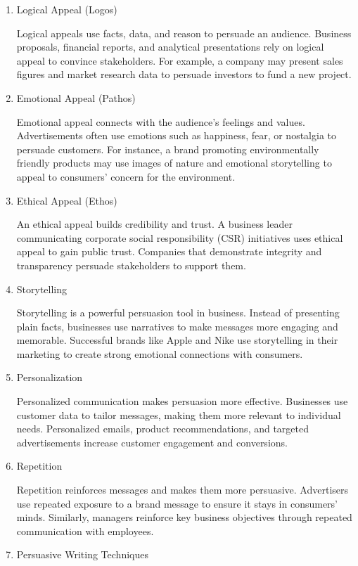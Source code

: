 \documentclass[a4paper]{article}
\begin{document}
\begin{enumerate}
\item Logical Appeal (Logos)

Logical appeals use facts, data, and reason to persuade an audience. Business proposals, financial reports, and analytical presentations rely on logical appeal to convince stakeholders. For example, a company may present sales figures and market research data to persuade investors to fund a new project.

\item Emotional Appeal (Pathos)

Emotional appeal connects with the audience’s feelings and values. Advertisements often use emotions such as happiness, fear, or nostalgia to persuade customers. For instance, a brand promoting environmentally friendly products may use images of nature and emotional storytelling to appeal to consumers’ concern for the environment.

\item Ethical Appeal (Ethos)

An ethical appeal builds credibility and trust. A business leader communicating corporate social responsibility (CSR) initiatives uses ethical appeal to gain public trust. Companies that demonstrate integrity and transparency persuade stakeholders to support them.

\item Storytelling

Storytelling is a powerful persuasion tool in business. Instead of presenting plain facts, businesses use narratives to make messages more engaging and memorable. Successful brands like Apple and Nike use storytelling in their marketing to create strong emotional connections with consumers.

\item Personalization

Personalized communication makes persuasion more effective. Businesses use customer data to tailor messages, making them more relevant to individual needs. Personalized emails, product recommendations, and targeted advertisements increase customer engagement and conversions.

\item Repetition

Repetition reinforces messages and makes them more persuasive. Advertisers use repeated exposure to a brand message to ensure it stays in consumers’ minds. Similarly, managers reinforce key business objectives through repeated communication with employees.
\bigskip
\bigskip
\item Persuasive Writing Techniques


\end{enumerate}
\end{document}
